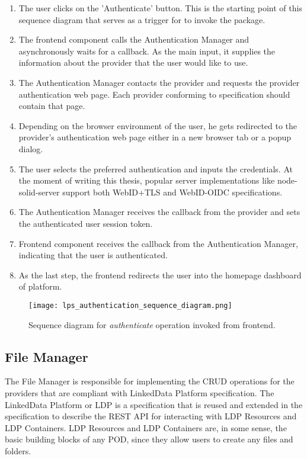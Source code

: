\begin{enumerate}
    \item The user clicks on the 'Authenticate' button. This is the starting point of this sequence diagram that serves as a trigger for \lpa{} to invoke the \lpa{} package.
    \item The frontend component calls the Authentication Manager and asynchronously waits for a callback. As the main input, it supplies the information about the \solid{} provider that the user would like to use.
    \item The Authentication Manager contacts the \solid{} provider and requests the provider authentication web page. Each provider conforming to \solid{} specification should contain that page.
    \item Depending on the browser environment of the user, he gets redirected to the provider's authentication web page either in a new browser tab or a popup dialog.
    \item The user selects the preferred authentication and inputs the credentials. At the moment of writing this thesis, popular \solid{} server implementations like node-solid-server support both WebID+TLS and WebID-OIDC specifications.
    \item The Authentication Manager receives the callback from the provider and sets the authenticated user session token.
    \item Frontend component receives the callback from the Authentication Manager, indicating that the user is authenticated.
    \item As the last step, the frontend redirects the user into the homepage dashboard of \lpa{} platform.
\end{enumerate}


\begin{figure}[h]
\centering
\texttt{[image: lps\_authentication\_sequence\_diagram.png]}
\caption{Sequence diagram for \textit{authenticate} operation invoked from \lpa{} frontend.}
\label{fig:lps_authentication_sequence_diagram}
\end{figure}


\subsection{File Manager}
The File Manager is responsible for implementing the CRUD operations for the \solid{}  providers that are compliant with LinkedData Platform specification. The LinkedData Platform or LDP  is a specification that is reused and extended in the \solid{} specification to describe the REST API for interacting with LDP Resources and LDP Containers. LDP Resources and LDP Containers are, in some sense, the basic building blocks of any \solid{} POD, since they allow users to create any files and folders. 


